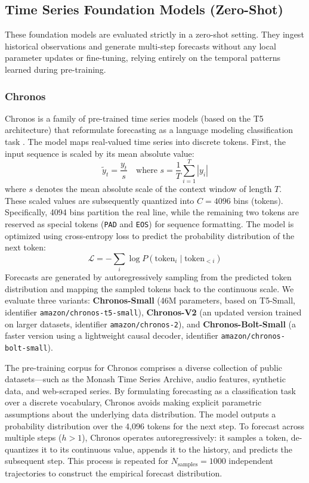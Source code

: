 \subsection{Time Series Foundation Models (Zero-Shot)}
These foundation models are evaluated strictly in a zero-shot setting. They ingest historical observations and generate multi-step forecasts without any local parameter updates or fine-tuning, relying entirely on the temporal patterns learned during pre-training.

\subsubsection{Chronos}
Chronos is a family of pre-trained time series models (based on the T5 architecture) that reformulate forecasting as a language modeling classification task \cite{chronos}. The model maps real-valued time series into discrete tokens. First, the input sequence is scaled by its mean absolute value:
\begin{equation}
\tilde{y}_t = \frac{y_t}{s} \quad \text{where } s = \frac{1}{T}\sum_{i=1}^T |y_i|
\end{equation}
where $s$ denotes the mean absolute scale of the context window of length $T$. These scaled values are subsequently quantized into $C = 4096$ bins (tokens). Specifically, 4094 bins partition the real line, while the remaining two tokens are reserved as special tokens (\texttt{PAD} and \texttt{EOS}) for sequence formatting. The model is optimized using cross-entropy loss to predict the probability distribution of the next token:
\begin{equation}
\mathcal{L} = -\sum_{i} \log P(\text{token}_{i} \mid \text{token}_{<i})
\end{equation}
Forecasts are generated by autoregressively sampling from the predicted token distribution and mapping the sampled tokens back to the continuous scale. We evaluate three variants: \textbf{Chronos-Small} (46M parameters, based on T5-Small, identifier \texttt{amazon/chronos-t5-small}), \textbf{Chronos-V2} (an updated version trained on larger datasets, identifier \texttt{amazon/chronos-2}), and \textbf{Chronos-Bolt-Small} (a faster version using a lightweight causal decoder, identifier \texttt{amazon/chronos-bolt-small}).

The pre-training corpus for Chronos comprises a diverse collection of public datasets---such as the Monash Time Series Archive, audio features, synthetic data, and web-scraped series. By formulating forecasting as a classification task over a discrete vocabulary, Chronos avoids making explicit parametric assumptions about the underlying data distribution. The model outputs a probability distribution over the 4,096 tokens for the next step. To forecast across multiple steps ($h > 1$), Chronos operates autoregressively: it samples a token, de-quantizes it to its continuous value, appends it to the history, and predicts the subsequent step. This process is repeated for $N_{\text{samples}}=1000$ independent trajectories to construct the empirical forecast distribution.

